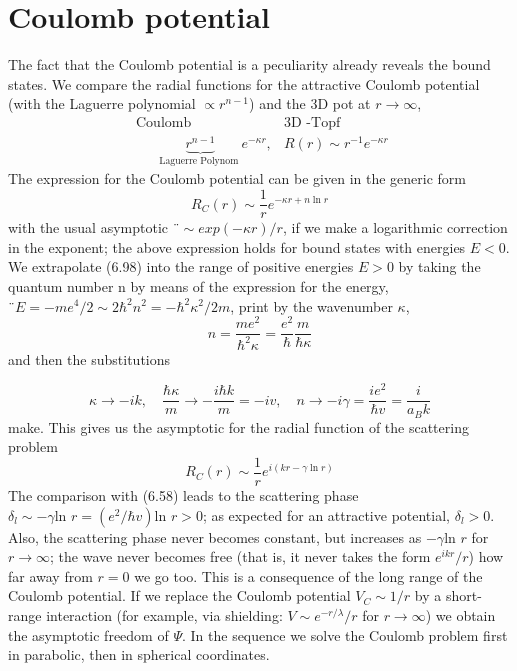 \section{Coulomb potential}
The fact that the Coulomb potential is a peculiarity already reveals the bound states. We compare the radial functions for the attractive Coulomb potential (with the Laguerre polynomial $\propto r^{n-1}$) and the 3D pot at $r \rightarrow\infty$,
$$
\begin{array}{cc}{\text { Coulomb }} & {3 \mathrm{D} \text { -Topf }} \\ {\qquad \underbrace{r^{n-1}}_{\text {Laguerre Polynom }} e^{-\kappa r},} & {R(r) \sim r^{-1} e^{-\kappa r}}\end{array}
$$
The expression for the Coulomb potential can be given in the generic form
\begin{equation}
    R_{C}(r) \sim \frac{1}{r} e^{-\kappa r+n \ln r}
    \end{equation}
with the usual asymptotic $¨ \sim exp (-\kappa r) / r$, if we make a logarithmic correction in the exponent; the above expression holds for bound states with energies $E <0$. We extrapolate (6.98) into the range of positive energies $E> 0$ by taking the quantum number n by means of the expression for the energy, $¨ E = -me^4 / 2 \sim 2\hbar^2n^2 = - \hbar^2\kappa^2 / 2m$, print by the wavenumber $\kappa$,
\begin{equation}
    n=\frac{m e^{2}}{\hbar^{2} \kappa}=\frac{e^{2}}{\hbar} \frac{m}{\hbar \kappa}
    \end{equation}
and then the substitutions

\begin{equation}
    \kappa \rightarrow-i k, \quad \frac{\hbar \kappa}{m} \rightarrow-\frac{i \hbar k}{m}=-i v, \quad n \rightarrow-i \gamma=\frac{i e^{2}}{\hbar v}=\frac{i}{a_{B} k}
    \end{equation}
make. This gives us the asymptotic for the radial function of the scattering problem
\begin{equation}
    R_{C}(r) \sim \frac{1}{r} e^{i(k r-\gamma \ln r)}
    \end{equation}
The comparison with (6.58) leads to the scattering phase $\delta_l\sim -\gamma \text{ln } r = (e^2 / \hbar v) \text{ln } r> 0$; as expected for an attractive potential, $\delta_l> 0$. Also, the scattering phase never becomes constant, but increases as $ -\gamma \text{ln } r$ for $r \rightarrow \infty$; the wave never becomes free (that is, it never takes the form $e^{ikr }/ r$) how far away from $r = 0$ we go too. This is a consequence of the long range of the Coulomb potential. If we replace the Coulomb potential $V_C\sim 1 / r$ by a short-range interaction (for example, via shielding: $V \sim e^{-r / \lambda} / r$ for $r\rightarrow\infty$) we obtain the asymptotic freedom of $\Psi$. In the sequence we solve the Coulomb problem first in parabolic, then in spherical coordinates.

